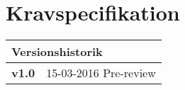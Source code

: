 \chapter{Kravspecifikation}

\begin{table}[H] \centering
\begin{tabular}{|p{2cm}|p{8cm}|}
	\hline
		\multicolumn{2}{|l|}{Versionshistorik} \\ \hline
		\textbf{v1.0} &15-03-2016 Pre-review\\ \hline
	\end{tabular}
\end{table}


\clearpage


\clearpage


\clearpage


\clearpage


\clearpage

% 
